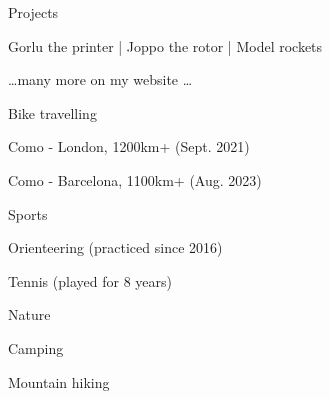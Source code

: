

\begin{cvskills}

  \cvskill
  {Projects} %
  {
    \begin{cvitems} %
      \item {Gorlu the printer | Joppo the rotor | Model rockets}
      \item {\dots many more on my website \dots}
    \end{cvitems}
  }

  \cvskill
  {Bike travelling} %
  {
    \begin{cvitems} %
      \item {Como - London, 1200km+ (Sept. 2021)}
      \item {Como - Barcelona, 1100km+ (Aug. 2023)}
    \end{cvitems}
  }

  \cvskill
  {Sports} %
  {
    \begin{cvitems} %
      \item {Orienteering (practiced since 2016)}
      \item {Tennis (played for 8 years)}
    \end{cvitems}
  }

  \cvskill
  {Nature} %
  {
    \begin{cvitems} %
      \item {Camping}
      \item {Mountain hiking}
    \end{cvitems}
  }

\end{cvskills}